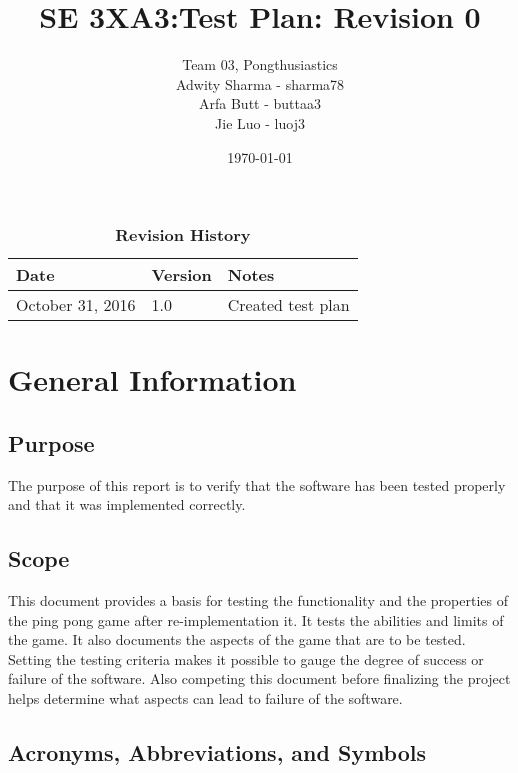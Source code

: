 \documentclass[12pt,letterpaper]{article}
\title{SE 3XA3:Test Plan: Revision 0}
\author{Team 03, Pongthusiastics 		
\\ Adwity Sharma - sharma78 		
\\ Arfa Butt - buttaa3 	
	\\ Jie Luo - luoj3 }
\date{\today}
\begin{document}
\maketitle
\newpage
\tableofcontents

\listoftables
\listoffigures
\begin{table}[h]
\caption{\bf Revision History}
\begin{tabularx}{\textwidth}{p{3.5cm}p{2cm}X}
\toprule {\bf Date} & {\bf Version} & {\bf Notes}\\
\midrule
October 31, 2016 & 1.0 & Created test plan \\
\bottomrule
\end{tabularx}
\end{table}

\newpage
	
	\section{General Information}
	\subsection{Purpose}
	The purpose of this report is to verify that the software has been tested properly and that it was implemented correctly.
	
	\subsection{Scope}
	This document provides a basis for testing the functionality and the properties of the ping pong game after re-implementation it. It tests the abilities and limits of the game. It also documents the aspects of the game that are to be tested. Setting the testing criteria makes it possible to gauge the degree of success or failure of the software. Also competing this document before finalizing the project helps determine what aspects can lead to failure of the software.
	
	\subsection{Acronyms, Abbreviations, and Symbols}
\end{document}

